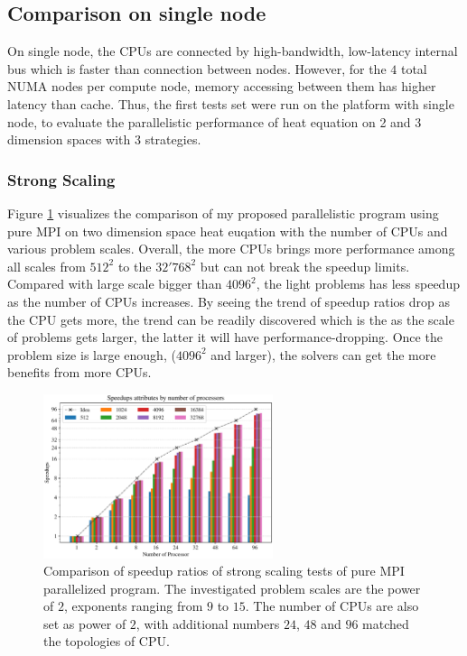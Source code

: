 \subsection{Comparison on single node}
On single node, the CPUs are connected by high-bandwidth, low-latency internal bus which is faster than connection between nodes.
However, for the $4$ total NUMA nodes per compute node, memory accessing between them has higher latency than cache.
Thus, the first tests set were run on the platform with single node, to evaluate the parallelistic performance of heat equation on 2 and 3 dimension spaces with 
3 strategies.


\subsubsection{Strong Scaling}
Figure \ref{FIG:Benchmark:PURE_MPI} visualizes the comparison of my proposed parallelistic program using pure MPI on two dimension space heat euqation with 
the number of CPUs and various problem scales.
Overall, the more CPUs brings more performance among all scales from $512^2$ to the $32'768^2$ but can not break the speedup limits.
Compared with large scale bigger than $4096^2$, the light problems has less speedup as the number of CPUs increases.
By seeing the trend of speedup ratios drop as the CPU gets more, 
the trend can be readily discovered which is the as the scale of problems gets larger, the latter it will have performance-dropping.
Once the problem size is large enough, ($4096^2$ and larger), the solvers can get the more benefits from more CPUs.

\begin{figure}[htbp]
  \centering
  \includegraphics[width=0.6\textwidth]{figure/FIG_Benchmark_pure_mpi.pdf}
  \caption{
    Comparison of speedup ratios of strong scaling tests of pure MPI parallelized program. 
    The investigated problem scales are the power of $2$, exponents ranging from $9$ to $15$.
    The number of CPUs are also set as power of $2$, with additional numbers $24$, $48$ and $96$ matched the topologies of CPU.
  }
  \label{FIG:Benchmark:PURE_MPI}
\end{figure}

